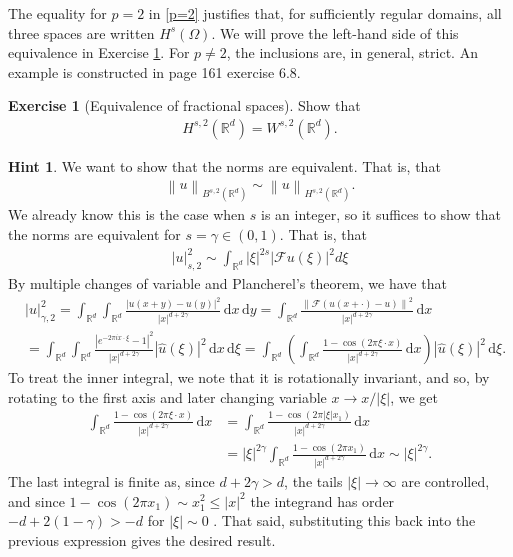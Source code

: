 \documentclass[
    a4paper,
    DIV=14,
    abstract=true,
    numbers=noenddot
]
{scrartcl}
\theoremstyle{definition}
\newtheorem{exercise}{Exercise}
\newtheorem*{hint}{Hint}
\newcommand{\wh}[1]{\widehat{#1}}
\renewcommand{\norm}[1]{\left\lVert #1 \right\rVert}\renewcommand{\abs}[1]{\left| #1 \right|}
\renewcommand{\d}{\,\mathrm{d}}\newcommand{\dx}{\,\mathrm{d}x}
\newcommand{\R}{\mathbb{R}}
\newcommand{\Ff}{\mathcal{F}}
\begin{document}
The equality for $p=2$ in \eqref{p=2} justifies that, for sufficiently regular domains, all three spaces are written $H^s(\Omega )$.   We will prove the left-hand side of this equivalence in Exercise \ref{equivalence of fractional spaces}. For $p\neq 2$, the inclusions are, in general, strict. An example is constructed in \cite{stein1970singular} page 161 exercise 6.8.
\begin{exercise}[Equivalence of fractional spaces]\label{equivalence of fractional spaces}
    Show that
    \begin{align*}
        H^{s,2}(\R^d)=W^{s,2}(\R^d).
    \end{align*}
\end{exercise}
\begin{hint}
    We want to show that the norms are equivalent. That is, that
    \begin{align*}
        \norm{u}_{B^{s,2}(\R^d)}\sim \norm{u}_{H^{s,2}(\R^d)}.
    \end{align*}
    We already know this is the case when $s$ is an integer, so it suffices to show that the norms are equivalent for $s= \gamma  \in (0,1)$. That is, that
    \begin{align*}
        |u|_{s,2}^2\sim \int_{\mathbb{R}^d}|\xi|^{2 s}|\mathcal{F} u(\xi)|^2 d \xi
    \end{align*}
    By multiple changes of variable and Plancherel's theorem, we have that
    \begin{align*}
         & |u|_{\gamma ,2}^2  =\int_{\R^d}\int_{\R^d}\frac{\abs{u(x+y)-u(y)}^2}{\abs{x}^{d+2\gamma	}}\d x \d y                                                                                                       = \int_{\R^d}\frac{\norm{\Ff (u(x+\cdot )-u)}^2}{\abs{x}^{d+2\gamma	}}\d x \\
         & =\int_{\R^d}\int_{\R^d}  \frac{|e^{-2 \pi i x \cdot \xi}-1|^2}{\abs{x}^{d+2\gamma	}}|\wh{u}(\xi)|^2\d x\d\xi =\int_{\R^d}\left(\int_{\R^d}  \frac{1-\cos(2\pi \xi\cdot x)}{\abs{x}^{d+2\gamma	}}\d x\right)|\wh{u}(\xi)|^2\d\xi.
    \end{align*}
    To treat the inner integral, we note that it is rotationally invariant, and so, by rotating to the first axis and later changing variable $x \to x / \abs{\xi}$, we get
    \begin{align*}
        \int_{\R^d}  \frac{1-\cos(2\pi \xi\cdot x)}{\abs{x}^{d+2\gamma	}}\d x & =\int_{\R^d}  \frac{1-\cos(2\pi \abs{\xi}x_1 )}{\abs{x}^{d+2\gamma	}}\d x                                          \\
                                                                              & =\abs{\xi}^{2 \gamma } \int_{\R^d}  \frac{1-\cos(2\pi  x_1) }{\abs{x}^{d+2\gamma	}}\d x\sim \abs{\xi}^{2 \gamma }.
    \end{align*}
    The last integral is finite as, since $d+2\gamma >d$, the tails $\abs{\xi}\to\infty$ are controlled, and since $1-\cos(2\pi x_1)\sim x_1^2\leq \abs{x}^2$ the integrand has order $-d+2(1-\gamma)>-d$ for $\abs{\xi}\sim 0$ . That said, substituting this back into the previous expression gives the desired result.
\end{hint}
\end{document}
